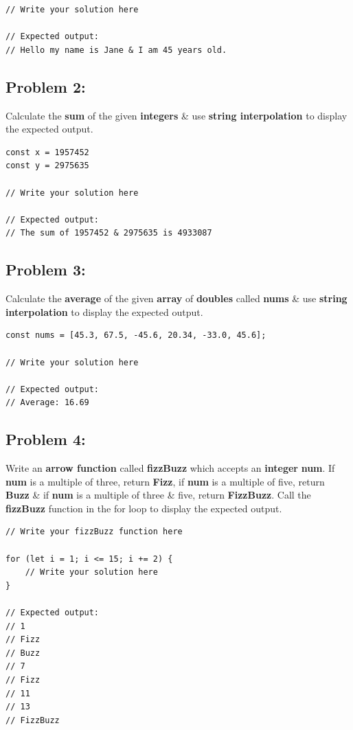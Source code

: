 \documentclass{article}
\begin{document}
\begin{verbatim}
// Write your solution here

// Expected output:
// Hello my name is Jane & I am 45 years old.
\end{verbatim}

\subsection*{Problem 2:} 
Calculate the \textbf{sum} of the given \textbf{integers} \& use \textbf{string interpolation} to display the expected output.

\begin{verbatim}
const x = 1957452
const y = 2975635

// Write your solution here

// Expected output:
// The sum of 1957452 & 2975635 is 4933087
\end{verbatim}

\subsection*{Problem 3:} 
Calculate the \textbf{average} of the given \textbf{array} of \textbf{doubles} called \textbf{nums} \& use \textbf{string interpolation} to display the expected output.

\begin{verbatim}
const nums = [45.3, 67.5, -45.6, 20.34, -33.0, 45.6];

// Write your solution here

// Expected output:
// Average: 16.69 
\end{verbatim}

\subsection*{Problem 4:}
Write an \textbf{arrow function} called \textbf{fizzBuzz} which accepts an \textbf{integer} \textbf{num}. If \textbf{num} is a multiple of three, return \textbf{Fizz}, if \textbf{num} is a multiple of five, return \textbf{Buzz} \& if \textbf{num} is a multiple of three \& five, return \textbf{FizzBuzz}. Call the \textbf{fizzBuzz} function in the for loop to display the expected output.

\begin{verbatim}
// Write your fizzBuzz function here

for (let i = 1; i <= 15; i += 2) {
    // Write your solution here
}

// Expected output:
// 1
// Fizz 
// Buzz
// 7
// Fizz
// 11
// 13
// FizzBuzz
\end{verbatim}
\end{document}
